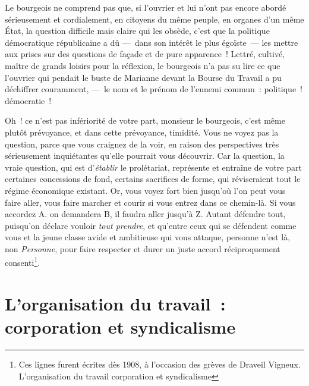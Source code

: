 \documentclass[french,twoside]{book} %
\begin{document}
\noindent Le bourgeois ne comprend pas que, si l’ouvrier et lui n’ont pas encore abordé sérieusement et cordialement, en citoyens du même peuple, en organes d’un même État, la question difficile mais claire qui les obsède, c’est que la politique démocratique républicaine a dû — dans son intérêt le plus égoïste — les mettre aux prises sur des questions de façade et de pure apparence ! Lettré, cultivé, maître de grands loisirs pour la réflexion, le bourgeois n’a pas su lire ce que l’ouvrier qui pendait le buste de Marianne devant la Bourse du Travail a pu déchiffrer couramment, — le nom et le prénom de l’ennemi commun : politique ! démocratie !\par
Oh ! ce n’est pas infériorité de votre part, monsieur le bourgeois, c’est même plutôt prévoyance, et dans cette prévoyance, timidité. Vous ne voyez pas la question, parce que vous craignez de la voir, en raison des perspectives très sérieusement inquiétantes qu’elle pourrait vous découvrir. Car la question, la vraie question, qui est d’\emph{établir} le prolétariat, représente et entraîne de votre part certaines concessions de fond, certains sacrifices de forme, qui réviseraient tout le régime économique existant. Or, vous voyez fort bien jusqu’où l’on peut vous faire aller, vous faire marcher et courir si vous entrez dans ce chemin-là. Si vous accordez A. on demandera B, il faudra aller jusqu’à Z. Autant défendre tout, puisqu’on déclare vouloir \emph{tout prendre}, et qu’entre ceux qui se défendent comme vous et la jeune classe avide et ambitieuse qui vous attaque, personne n’est là, non \emph{Personne}, pour faire respecter et durer un juste accord réciproquement consenti\footnote{Ces lignes furent écrites dès 1908, à l’occasion des grèves de Draveil Vigneux. L’organisation du travail corporation et syndicalisme}.
\section[L’organisation du travail : corporation et syndicalisme]{L’organisation du travail : corporation et syndicalisme}
\end{document}
